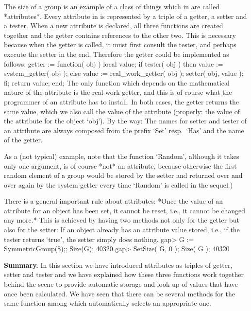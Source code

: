 The size of a group is an example of a class of things  which in {\GAP}
are called *attributes*.
Every attribute in  {\GAP} is represented by  a triple  of a getter,  a
setter   and a  tester.  When a  new  attribute  is  declared, all  three
functions are created together and  the getter contains references to the
other two.  This is necessary because when  the getter is called, it must
first  consult the tester,   and perhaps execute the  setter  in the end.
Therefore the getter could be implemented as follows:
\begintt
getter := function( obj )
local   value;
    if tester( obj )  then
        value := system_getter( obj );
    else
        value := real_work_getter( obj );
        setter( obj, value );
    fi;
    return value;
end;
\endtt
The  only  function which  depends on   the  mathematical  nature  of the
attribute  is  the  real-work getter,  and this   is  of course  what the
programmer of  an  attribute has to  install.  In both cases,  the getter
returns  the same value, which  we also call  the  value of the attribute
(properly: the value of the attribute for the object `obj').
By the way:
The names for setter and tester of an attribute are always composed from
the prefix `Set' resp.~`Has' and the name of the getter.

As a (not typical) example, note that the {\GAP} function `Random',
although it takes only one argument, is of course *not* an attribute,
because otherwise the first random element of a group would be stored by
the setter and returned over and over again by the system getter
every time `Random' is called in the sequel.)

There is a general important rule about attributes: *Once the value of an
attribute for an object has been set, it cannot be reset, i.e., it cannot
be changed any more.* This is achieved by having two methods not only for
the getter but also for the setter: If an object already has an attribute
value stored, i.e., if the tester  returns `true', the setter simply does
nothing.
\beginexample
gap> G := SymmetricGroup(8);; Size(G);
40320
gap> SetSize( G, 0 ); Size( G );
40320
\endexample

%

{\bf  Summary.} In this section  we have introduced attributes as triples
of getter, setter   and tester and    we have explained how  these  three
functions work together behind  the  scene to provide automatic  storage
and look-up of  values that have once been  calculated. We have seen that
there can be several methods for  the   same function  among which {\GAP}
automatically selects an appropriate one.

